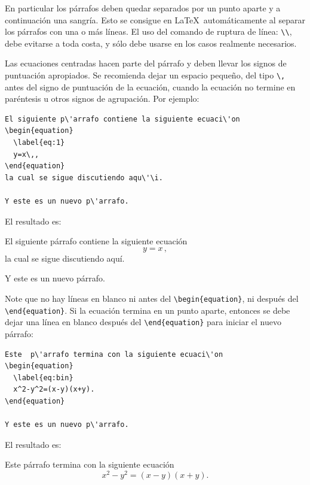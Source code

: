 \documentclass{article}
\begin{document}
En particular los párrafos deben quedar separados por un punto aparte y a continuación una sangría. %
Esto se consigue en \LaTeX\ automáticamente al separar los párrafos con una o más líneas. El uso del comando de ruptura de línea: \verb|\\|, debe evitarse a toda costa, y sólo debe usarse en los casos realmente necesarios.  


Las ecuaciones centradas hacen parte del párrafo y deben llevar los signos de puntuación apropiados. Se recomienda dejar un espacio pequeño, del tipo \verb|\,| antes del signo de puntuación de la ecuación, cuando la ecuación no termine en paréntesis u otros signos de agrupación. Por ejemplo:
\begin{lstlisting}
El siguiente p\'arrafo contiene la siguiente ecuaci\'on
\begin{equation}
  \label{eq:1}
  y=x\,,
\end{equation}
la cual se sigue discutiendo aqu\'\i.

Y este es un nuevo p\'arrafo.
\end{lstlisting}
El resultado es:

El siguiente párrafo contiene la siguiente ecuación
\begin{equation}
  \label{eq:1}
  y=x\,,
\end{equation}
la cual se sigue discutiendo aquí.

Y este es un nuevo párrafo.

\bigskip

Note que no hay líneas en blanco ni antes del \verb|\begin{equation}|, ni después del \verb|\end{equation}|. Si la ecuación termina en un punto aparte, entonces se debe dejar una línea en blanco después del \verb|\end{equation}| para iniciar el nuevo párrafo:

\begin{lstlisting}
Este  p\'arrafo termina con la siguiente ecuaci\'on
\begin{equation}
  \label{eq:bin}
  x^2-y^2=(x-y)(x+y).
\end{equation}

Y este es un nuevo p\'arrafo.
\end{lstlisting}
El resultado es:

Este  párrafo termina con la siguiente ecuación
\begin{equation}
  \label{eq:bin}
  x^2-y^2=(x-y)(x+y).
\end{equation}
\end{document}
